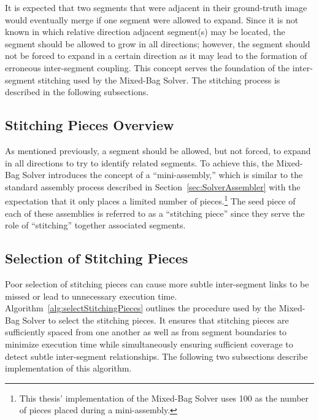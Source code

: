 It is expected that two segments that were adjacent in their ground-truth image would eventually merge if one segment were allowed to expand. Since it is not known in which relative direction adjacent segment(s) may be located, the segment should be allowed to grow in all directions; however, the segment should not be forced to expand in a certain direction as it may lead to the formation of erroneous inter-segment coupling.  This concept serves the foundation of the inter-segment stitching used by the Mixed-Bag Solver.  The stitching process is described in the following subsections.

\subsection{Stitching Pieces Overview}

As mentioned previously, a segment should be allowed, but not forced, to expand in all directions to try to identify related segments.  To achieve this, the Mixed-Bag Solver introduces the concept of a ``mini-assembly,'' which is similar to the standard assembly process described in Section~\ref{sec:SolverAssembler} with the expectation that it only places a limited number of pieces.\footnote{This thesis' implementation of the Mixed-Bag Solver uses 100 as the number of pieces placed during a mini-assembly.}  The seed piece of each of these assemblies is referred to as a ``stitching piece'' since they serve the role of ``stitching'' together associated segments.

\subsection{Selection of Stitching Pieces}\label{sec:stitchingPieceSelection}

Poor selection of stitching pieces can cause more subtle inter-segment links to be missed or lead to unnecessary execution time.  Algorithm~\ref{alg:selectStitchingPieces} outlines the procedure used by the Mixed-Bag Solver to select the stitching pieces.  It ensures that stitching pieces are sufficiently spaced from one another as well as from segment boundaries to minimize execution time while simultaneously ensuring sufficient coverage to detect subtle inter-segment relationships.  The following two subsections describe implementation of this algorithm.


